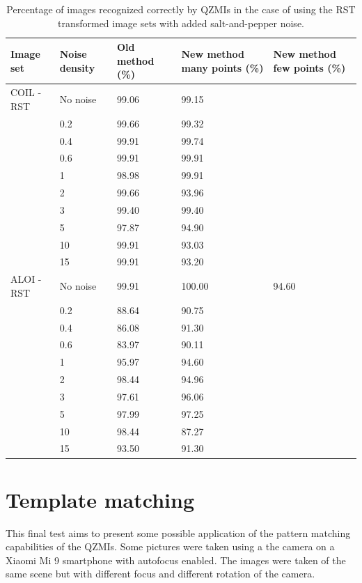 \begin{table}
    \centering
    \begin{tabular}{|p{2.15cm}|p{1.8cm}|p{3cm}|p{2.74cm}|p{2.6cm}|} \hline
        \textbf{Image set} & \textbf{Noise density} & \textbf{Old method} (\%) & \textbf{New method} many points (\%)& \textbf{New method} few points (\%) \\ \hline\hline
        COIL - RST & No noise & 99.06 & 99.15 & \\ \cline{2-5}
        & 0.2 & 99.66 & 99.32 &  \\ \cline{2-5}
        & 0.4 & 99.91 & 99.74 &  \\ \cline{2-5}
        & 0.6 & 99.91 & 99.91 &  \\ \cline{2-5}
        & 1 & 98.98 & 99.91 &  \\ \cline{2-5}
        & 2 & 99.66 & 93.96 &  \\ \cline{2-5}
        & 3 & 99.40 & 99.40 &  \\ \cline{2-5}
        & 5 & 97.87 & 94.90 &  \\ \cline{2-5}
        & 10 & 99.91 & 93.03 &  \\ \cline{2-5}
        & 15 & 99.91 & 93.20 &  \\ \cline{1-5}
        ALOI - RST & No noise & 99.91 & 100.00 & 94.60 \\ \cline{2-5}
        & 0.2 & 88.64 & 90.75 &  \\ \cline{2-5}
        & 0.4 & 86.08 & 91.30 &  \\ \cline{2-5}
        & 0.6 & 83.97 & 90.11 &  \\ \cline{2-5}
        & 1 & 95.97 & 94.60 &  \\ \cline{2-5}
        & 2 & 98.44 & 94.96 &  \\ \cline{2-5}
        & 3 & 97.61 & 96.06 &  \\ \cline{2-5}
        & 5 & 97.99 & 97.25 &  \\ \cline{2-5}
        & 10 & 98.44 & 87.27 &  \\ \cline{2-5}
        & 15 & 93.50 & 91.30 &  \\ \cline{1-5}
    \end{tabular}
    \caption{Percentage of images recognized correctly by QZMIs in the case of using the RST transformed image sets with added salt-and-pepper noise.}
    \label{tab:recognition_salt}
\end{table}

\section{Template matching}
This final test aims to present some possible application of the pattern matching capabilities of the QZMIs. Some pictures were taken using a the camera on a Xiaomi Mi 9 smartphone with autofocus enabled. The images were taken of the same scene but with different focus and different rotation of the camera.

